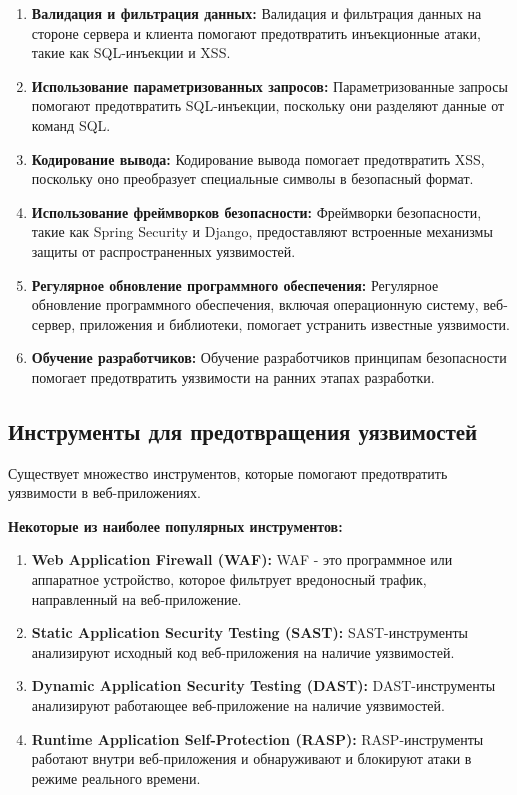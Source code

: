 \documentclass[a4paper,12pt]{diplom}
\begin{document}
	 \begin{enumerate}[label=\arabic{enumi})]
	 	\item \textbf{Валидация и фильтрация данных:}  Валидация и фильтрация данных на стороне сервера и клиента помогают предотвратить инъекционные атаки, такие как SQL-инъекции и XSS.
	 	\item \textbf{Использование параметризованных запросов:}  Параметризованные запросы помогают предотвратить SQL-инъекции, поскольку они разделяют данные от команд SQL. 
	 	\item \textbf{Кодирование вывода:}  Кодирование вывода помогает предотвратить XSS, поскольку оно преобразует специальные символы в безопасный формат.
	 	\item \textbf{Использование фреймворков безопасности:}  Фреймворки безопасности, такие как Spring Security и Django, предоставляют встроенные механизмы защиты от распространенных уязвимостей.
	 	\item \textbf{Регулярное обновление программного обеспечения:}  Регулярное обновление программного обеспечения, включая операционную систему, веб-сервер, приложения и библиотеки, помогает устранить известные уязвимости.
	 	\item \textbf{Обучение разработчиков:}  Обучение разработчиков принципам безопасности помогает предотвратить уязвимости на ранних этапах разработки. 
	 \end{enumerate}
	 
	 \subsection{Инструменты для предотвращения уязвимостей}
	 
	 Существует множество инструментов, которые помогают предотвратить уязвимости в веб-приложениях.  
	 
	 \textbf{Некоторые из наиболее популярных инструментов:}
	 
	 \begin{enumerate}[label=\arabic{enumi})]
	 	\item \textbf{Web Application Firewall (WAF):}  WAF - это программное или аппаратное устройство, которое фильтрует вредоносный трафик, направленный на веб-приложение.
	 	\item \textbf{Static Application Security Testing (SAST):} SAST-инструменты анализируют исходный код веб-приложения на наличие уязвимостей. 
	 	\item \textbf{Dynamic Application Security Testing (DAST):}  DAST-инструменты анализируют работающее веб-приложение на наличие уязвимостей. 
	 	\item \textbf{Runtime Application Self-Protection (RASP):} RASP-инструменты работают внутри веб-приложения и обнаруживают и блокируют атаки в режиме реального времени. 
	 \end{enumerate}
	 				
\end{document}
